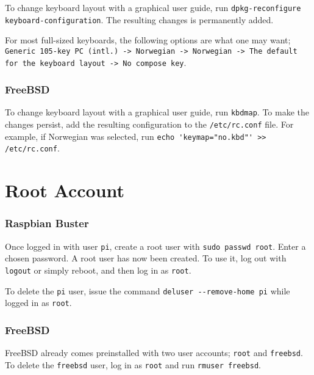 To change keyboard layout with a graphical user guide, run \lstinline{dpkg-reconfigure keyboard-configuration}. The resulting changes is permanently added.

For most full-sized keyboards, the following options are what one may want; \lstinline{Generic 105-key PC (intl.) -> Norwegian -> Norwegian -> The default for the keyboard layout -> No compose key}.


\subsubsection{FreeBSD}

To change keyboard layout with a graphical user guide, run \lstinline{kbdmap}. To make the changes persist, add the resulting configuration to the \lstinline{/etc/rc.conf} file. For example, if Norwegian was selected, run \lstinline{echo 'keymap="no.kbd"' >> /etc/rc.conf}.









\section{Root Account} \label{root_account}


\subsubsection{Raspbian Buster}

Once logged in with user \lstinline{pi}, create a root user with \lstinline{sudo passwd root}. Enter a chosen password. A root user has now been created. To use it, log out with \lstinline{logout} or simply reboot, and then log in as \lstinline{root}.

To delete the \lstinline{pi} user, issue the command \lstinline{deluser --remove-home pi} while logged in as \lstinline{root}.


\subsubsection{FreeBSD}

FreeBSD already comes preinstalled with two user accounts; \lstinline{root} and \lstinline{freebsd}. To delete the \lstinline{freebsd} user, log in as \lstinline{root} and run \lstinline{rmuser freebsd}.









